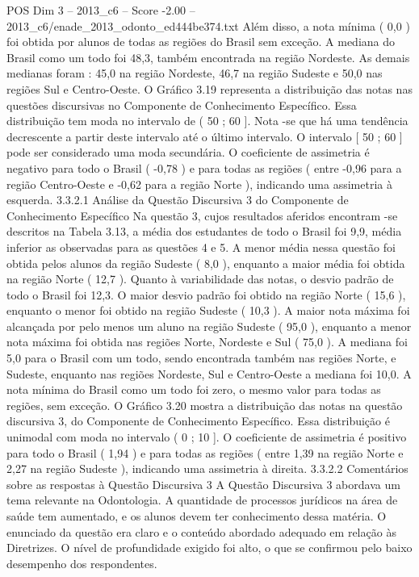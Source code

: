 \begin{textsample}{POS Dim 3 – 2013\_c6 – Score -2.00 – 2013\_c6/enade\_2013\_odonto\_ed444be374.txt}
Além disso, a nota mínima ( 0,0 ) foi obtida por alunos de todas as regiões do Brasil sem exceção.
A mediana do Brasil como um todo foi 48,3, também encontrada na região Nordeste.
As demais medianas foram : 45,0 na região Nordeste, 46,7 na região Sudeste e 50,0 nas regiões Sul e Centro-Oeste.
O Gráfico 3.19 representa a distribuição das notas nas questões discursivas no Componente de Conhecimento Específico.
Essa distribuição tem moda no intervalo de ( 50 ; 60 ].
Nota -se que há uma tendência decrescente a partir deste intervalo até o último intervalo.
O intervalo [ 50 ; 60 ] pode ser considerado uma moda secundária.
O coeficiente de assimetria é negativo para todo o Brasil ( -0,78 ) e para todas as regiões ( entre -0,96 para a região Centro-Oeste e -0,62 para a região Norte ), indicando uma assimetria à esquerda. 3.3.2.1 Análise da Questão Discursiva 3 do Componente de Conhecimento Específico Na questão 3, cujos resultados aferidos encontram -se descritos na Tabela 3.13, a média dos estudantes de todo o Brasil foi 9,9, média inferior as observadas para as questões 4 e 5.
A menor média nessa questão foi obtida pelos alunos da região Sudeste ( 8,0 ), enquanto a maior média foi obtida na região Norte ( 12,7 ).
Quanto à variabilidade das notas, o desvio padrão de todo o Brasil foi 12,3.
O maior desvio padrão foi obtido na região Norte ( 15,6 ), enquanto o menor foi obtido na região Sudeste ( 10,3 ).
A maior nota máxima foi alcançada por pelo menos um aluno na região Sudeste ( 95,0 ), enquanto a menor nota máxima foi obtida nas regiões Norte, Nordeste e Sul ( 75,0 ).
A mediana foi 5,0 para o Brasil com um todo, sendo encontrada também nas regiões Norte, e Sudeste, enquanto nas regiões Nordeste, Sul e Centro-Oeste a mediana foi 10,0.
A nota mínima do Brasil como um todo foi zero, o mesmo valor para todas as regiões, sem exceção.
O Gráfico 3.20 mostra a distribuição das notas na questão discursiva 3, do Componente de Conhecimento Específico.
Essa distribuição é unimodal com moda no intervalo ( 0 ; 10 ].
O coeficiente de assimetria é positivo para todo o Brasil ( 1,94 ) e para todas as regiões ( entre 1,39 na região Norte e 2,27 na região Sudeste ), indicando uma assimetria à direita. 3.3.2.2 Comentários sobre as respostas à Questão Discursiva 3 A Questão Discursiva 3 abordava um tema relevante na Odontologia.
A quantidade de processos jurídicos na área de saúde tem aumentado, e os alunos devem ter conhecimento dessa matéria.
O enunciado da questão era claro e o conteúdo abordado adequado em relação às Diretrizes.
O nível de profundidade exigido foi alto, o que se confirmou pelo baixo desempenho dos respondentes.

\end{textsample}
